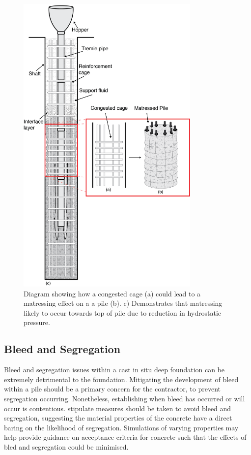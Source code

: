 \begin{figure}[H]
\centering
\includegraphics[width=0.8\textwidth]{matress.png}
\caption{\label{fig:matress}Diagram showing how a congested cage (a) could lead to a matressing effect on a a pile (b). c) Demonstrates that matressing likely to occur towards top of pile due to reduction in hydrostatic pressure.}
\end{figure}

\subsection{Bleed and Segregation}

Bleed and segregation issues within a cast in situ deep foundation can be extremely detrimental to the foundation. Mitigating the development of bleed within a pile should be a primary concern for the contractor, to prevent segregation occurring. Nonetheless, establishing when bleed has occurred or will occur is contentious.  stipulate measures should be taken to avoid bleed and segregation, suggesting the material properties of the concrete have a direct baring on the likelihood of segregation. Simulations of varying properties may help provide guidance on acceptance criteria for concrete such that the effects of bled and segregation could be minimised.

